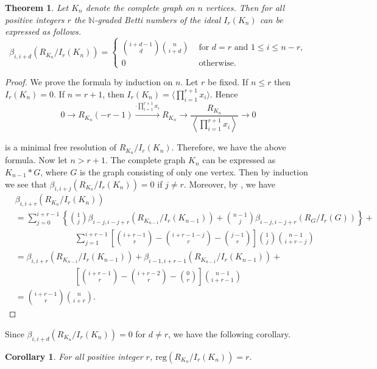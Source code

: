 \documentclass[12pt,reqno]{amsart}
\newtheorem{theorem}[proposition]{Theorem}
\newtheorem{corollary}[proposition]{Corollary}
\theoremstyle{definition}
\newcommand{\N}{\mathbb N}
\begin{document}
\begin{theorem}\label{complete graph}
    Let $K_n$ denote the complete graph on $n$ vertices. Then for all positive integers $r
    $ the $\N$-graded Betti numbers of the ideal $I_r(K_n)$ can be expressed as follows.
    {\footnotesize
    \[
\beta_{i,i+d}(R_{K_n}/I_r(K_n))=\begin{cases}
    {i+d-1\choose d}{n\choose i+d} &\text{ for } d=r \text{ and } 1\le i\le n-r,\\
    0 &\text{ otherwise.}
\end{cases}
\]  }
\end{theorem}

\begin{proof}
    We prove the formula by induction on $n$. Let $r$ be fixed. If $n\le r$ then $I_r(K_n)=0$. If $n=r+1$, then $I_r(K_n)=\langle \prod_{i=1}^{r+1}x_i \rangle$. Hence 
     {\footnotesize
     \[
    0\rightarrow R_{K_n}(-r-1)\xrightarrow{\cdot \prod_{i=1}^{r+1}x_i}R_{K_n}\rightarrow \frac{R_{K_n}}{\left\langle \prod_{i=1}^{r+1}x_i\right\rangle}\rightarrow 0
    \]
    }
    
    \noindent
    is a minimal free resolution of $R_{K_n}/I_r(K_n)$. Therefore, we have the above formula. Now let $n>r+1$. The complete graph $K_n$ can be expressed as $K_{n-1}*G$, where $G$ is the graph consisting of only one vertex. Then by induction we see that $\beta_{i,i+j}(R_{K_n}/I_r(K_n))=0$ if $j\neq r$. Moreover, by , we have
    {\footnotesize
    \begin{align*}
        &\beta_{i,i+r}(R_{K_n}/I_r(K_n))\\
        &=\sum_{j=0}^{i+r-1}\left\{{1\choose j}\beta_{i-j,i-j+r}(R_{K_{n-1}}/I_r(K_{n-1}))+{n-1\choose j}\beta_{i-j,i-j+r}(R_{G}/I_r(G)) \right\}+\\
&\hspace{7em}   \sum_{j=1}^{i+r-1} \left[{i+r-1\choose r}-{i+r-1-j\choose r}-{j-1\choose r}\right]{1\choose j}{n-1\choose i+r-j}\\
&=\beta_{i,i+r}(R_{K_{n-1}}/I_r(K_{n-1}))+\beta_{i-1,i+r-1}(R_{K_{n-1}}/I_r(K_{n-1}))+\\
&\hspace{7em} \left[{i+r-1\choose r}-{i+r-2\choose r}-{0\choose r}\right]{n-1\choose i+r-1}\\
&={i+r-1\choose r}{n\choose i+r}.
    \end{align*}}
    
\end{proof}

Since $\beta_{i,i+d}(R_{K_n}/I_r(K_n))= 0$ for $d\neq r$, we have the following corollary.
\begin{corollary}\label{corollary 1}
    For all positive integer $r$, $\mathrm{reg}(R_{K_n}/I_r(K_n))=r$.
\end{corollary}
\end{document}
